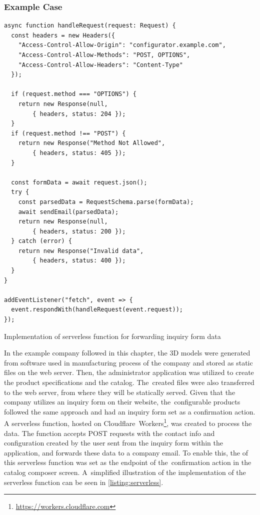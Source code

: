 \subsubsection{Example Case}

\begin{listing}[h!]
\begin{verbatim}
async function handleRequest(request: Request) {
  const headers = new Headers({
    "Access-Control-Allow-Origin": "configurator.example.com",
    "Access-Control-Allow-Methods": "POST, OPTIONS",
    "Access-Control-Allow-Headers": "Content-Type"
  });

  if (request.method === "OPTIONS") {
    return new Response(null,
        { headers, status: 204 });
  }
  if (request.method !== "POST") {
    return new Response("Method Not Allowed",
        { headers, status: 405 });
  }

  const formData = await request.json();
  try {
    const parsedData = RequestSchema.parse(formData);
    await sendEmail(parsedData);
    return new Response(null, 
        { headers, status: 200 });
  } catch (error) {
    return new Response("Invalid data",
        { headers, status: 400 });
  }
}

addEventListener("fetch", event => {
  event.respondWith(handleRequest(event.request));
});
\end{verbatim}
\caption{Implementation of serverless function for forwarding inquiry form data}
\label{listing:serverless}
\end{listing}

In the example company followed in this chapter, the 3D models were generated from  software used in manufacturing process of the company and stored as static files on the web server. Then, the administrator application was utilized to create the product specifications and the catalog. The~created files were also transferred to the web server, from where they will be statically served. Given that the company utilizes an inquiry form on their website, the~configurable products followed the same approach and had an inquiry form set as a confirmation action. A serverless function, hosted on Cloudflare~Workers\footnote{\url{https://workers.cloudflare.com}}, was created to process the data. The function accepts POST requests with the contact info and configuration created by the user sent from the inquiry form within the application, and forwards these data to a company email. To enable this, the  of this serverless function was set as the endpoint of the~confirmation action in the catalog composer screen. A~simplified illustration of the implementation of the serverless function can be seen in \autoref{listing:serverless}.


